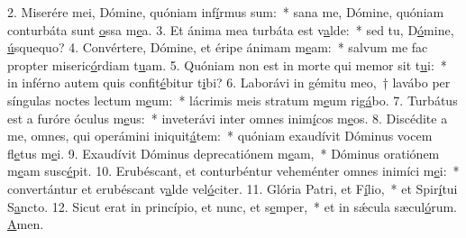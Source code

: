 2. Miserére mei, Dómine, quóniam inf\uline{í}rmus sum:~* sana me, Dómine, quóniam conturbáta sunt \uline{o}ssa m\uline{e}a.
3. Et ánima mea turbáta est v\uline{a}lde:~* sed tu, D\uline{ó}mine, \uline{ú}squequo?
4. Convértere, Dómine, et éripe ánimam m\uline{e}am:~* salvum me fac propter miseric\uline{ó}rdiam t\uline{u}am.
5. Quóniam non est in morte qui memor sit t\uline{u}i:~* in inférno autem quis confit\uline{é}bitur t\uline{i}bi?
6. Laborávi in gémitu meo,~† lavábo per síngulas noctes lectum m\uline{e}um:~* lácrimis meis stratum m\uline{e}um rig\uline{á}bo.
7. Turbátus est a furóre óculus m\uline{e}us:~* inveterávi inter omnes inim\uline{í}cos m\uline{e}os.
8. Discédite a me, omnes, qui operámini iniquit\uline{á}tem:~* quóniam exaudívit Dóminus vocem fl\uline{e}tus m\uline{e}i.
9. Exaudívit Dóminus deprecatiónem m\uline{e}am,~* Dóminus oratiónem m\uline{e}am susc\uline{é}pit.
10. Erubéscant, et conturbéntur veheménter omnes inimíci m\uline{e}i:~* convertántur et erubéscant v\uline{a}lde vel\uline{ó}citer.
11. Glória Patri, et F\uline{í}lio,~* et Spir\uline{í}tui S\uline{a}ncto.
12. Sicut erat in princípio, et nunc, et s\uline{e}mper,~* et in sǽcula sæcul\uline{ó}rum. \uline{A}men.
